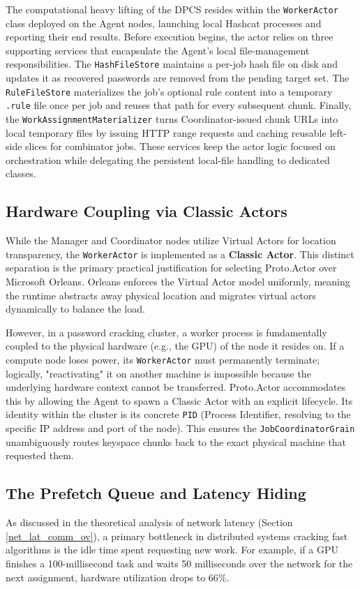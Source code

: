 The computational heavy lifting of the DPCS resides within the \verb|WorkerActor| class deployed on the Agent nodes, launching local Hashcat processes and reporting their end results. Before execution begins, the actor relies on three supporting services that encapsulate the Agent's local file-management responsibilities. The \verb|HashFileStore| maintains a per-job hash file on disk and updates it as recovered passwords are removed from the pending target set. The \verb|RuleFileStore| materializes the job's optional rule content into a temporary \verb|.rule| file once per job and reuses that path for every subsequent chunk. Finally, the \verb|WorkAssignmentMaterializer| turns Coordinator-issued chunk URLs into local temporary files by issuing HTTP range requests and caching reusable left-side slices for combinator jobs. These services keep the actor logic focused on orchestration while delegating the persistent local-file handling to dedicated classes.

\subsection{Hardware Coupling via Classic Actors}
While the Manager and Coordinator nodes utilize Virtual Actors for location transparency, the \verb|WorkerActor| is implemented as a \textbf{Classic Actor}. This distinct separation is the primary practical justification for selecting Proto.Actor over Microsoft Orleans. Orleans enforces the Virtual Actor model uniformly, meaning the runtime abstracts away physical location and migrates virtual actors dynamically to balance the load. 

However, in a password cracking cluster, a worker process is fundamentally coupled to the physical hardware (e.g., the GPU) of the node it resides on. If a compute node loses power, its \verb|WorkerActor| must permanently terminate; logically, "reactivating" it on another machine is impossible because the underlying hardware context cannot be transferred. Proto.Actor accommodates this by allowing the Agent to spawn a Classic Actor with an explicit lifecycle. Its identity within the cluster is its concrete \verb|PID| (Process Identifier, resolving to the specific IP address and port of the node). This ensures the \verb|JobCoordinatorGrain| unambiguously routes keyspace chunks back to the exact physical machine that requested them.


\subsection{The Prefetch Queue and Latency Hiding}
\label{sec:prefetch_queue}
As discussed in the theoretical analysis of network latency (Section \ref{net_lat_comm_ov}), a primary bottleneck in distributed systems cracking fast algorithms is the idle time spent requesting new work. For example, if a GPU finishes a 100-millisecond task and waits 50 milliseconds over the network for the next assignment, hardware utilization drops to 66\%.

